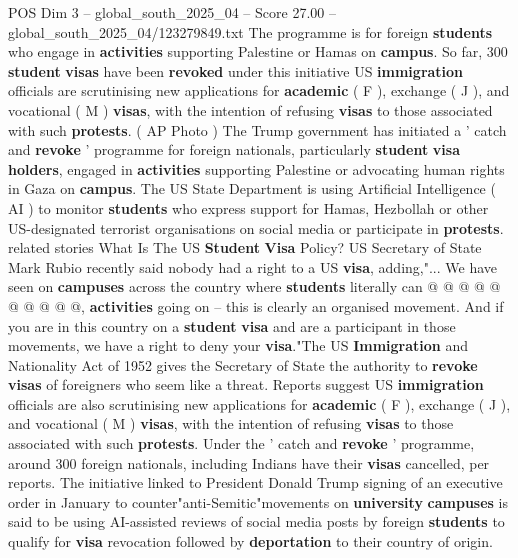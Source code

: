 \begin{textsample}{POS Dim 3 – global\_south\_2025\_04 – Score 27.00 – global\_south\_2025\_04/123279849.txt}  \label{ex:f3_pos_112}
The programme is for foreign \textbf{students} who engage in \textbf{activities} supporting Palestine or Hamas on \textbf{campus}.
So far, 300 \textbf{student} \textbf{visas} have been \textbf{revoked} under this initiative US \textbf{immigration} officials are scrutinising new applications for \textbf{academic} ( F ), exchange ( J ), and vocational ( M ) \textbf{visas}, with the intention of refusing \textbf{visas} to those associated with such \textbf{protests}. ( AP Photo ) The Trump government has initiated a ' catch and \textbf{revoke} ' programme for foreign nationals, particularly \textbf{student} \textbf{visa} \textbf{holders}, engaged in \textbf{activities} supporting Palestine or advocating human rights in Gaza on \textbf{campus}.
The US State Department is using Artificial Intelligence ( AI ) to monitor \textbf{students} who express support for Hamas, Hezbollah or other US-designated terrorist organisations on social media or participate in \textbf{protests}. related stories What Is The US \textbf{Student} \textbf{Visa} Policy?
US Secretary of State Mark Rubio recently said nobody had a right to a US \textbf{visa}, adding,"...
We have seen on \textbf{campuses} across the country where \textbf{students} literally can @ @ @ @ @ @ @ @ @ @, \textbf{activities} going on -- this is clearly an organised movement.
And if you are in this country on a \textbf{student} \textbf{visa} and are a participant in those movements, we have a right to deny your \textbf{visa}."The US \textbf{Immigration} and Nationality Act of 1952 gives the Secretary of State the authority to \textbf{revoke} \textbf{visas} of foreigners who seem like a threat.
Reports suggest US \textbf{immigration} officials are also scrutinising new applications for \textbf{academic} ( F ), exchange ( J ), and vocational ( M ) \textbf{visas}, with the intention of refusing \textbf{visas} to those associated with such \textbf{protests}.
Under the ' catch and \textbf{revoke} ' programme, around 300 foreign nationals, including Indians have their \textbf{visas} cancelled, per reports.
The initiative linked to President Donald Trump signing of an executive order in January to counter"anti-Semitic"movements on \textbf{university} \textbf{campuses} is said to be using AI-assisted reviews of social media posts by foreign \textbf{students} to qualify for \textbf{visa} revocation followed by \textbf{deportation} to their country of origin.

\end{textsample}
